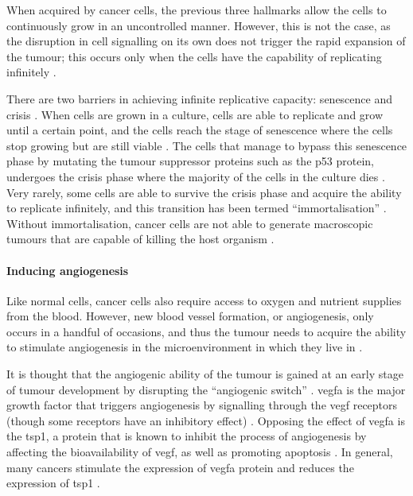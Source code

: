 \noindent
When acquired by cancer cells, the previous three hallmarks allow the cells to continuously grow in an uncontrolled manner.
However, this is not the case, as the disruption in cell signalling on its own does not trigger the rapid expansion of the tumour; this occurs only when the cells have the capability of replicating infinitely \citep{Hanahan2000, Hanahan2011}.

There are two barriers in achieving infinite replicative capacity: senescence and crisis \citep{Hanahan2011}.
When cells are grown in a culture, cells are able to replicate and grow until a certain point, and the cells reach the stage of senescence where the cells stop growing but are still viable \citep{Hanahan2011}.
The cells that manage to bypass this senescence phase by mutating the tumour suppressor proteins such as the p53 protein, undergoes the crisis phase where the majority of the cells in the culture dies \citep{Hanahan2011}.
Very rarely, some cells are able to survive the crisis phase and acquire the ability to replicate infinitely, and this transition has been termed ``immortalisation'' \citep{Hanahan2011, Wright1989}.
Without immortalisation, cancer cells are not able to generate macroscopic tumours that are capable of killing the host organism \citep{Hanahan2000,Hanahan2011}.

\paragraph{Inducing angiogenesis}

\noindent
Like normal cells, cancer cells also require access to oxygen and nutrient supplies from the blood.
However, new blood vessel formation, or angiogenesis, only occurs in a handful of occasions, and thus the tumour needs to acquire the ability to stimulate angiogenesis in the microenvironment in which they live in \citep{Hanahan2011}.

It is thought that the angiogenic ability of the tumour is gained at an early stage of tumour development by disrupting the ``angiogenic switch'' \citep{Hanahan2011}.
\Gls{vegfa} is the major growth factor that triggers angiogenesis by signalling through the \acrshort{vegf} receptors (though some receptors have an inhibitory effect) \citep{Yancopoulos2000}.
Opposing the effect of \Gls{vegfa} is the \gls{tsp1}, a protein that is known to inhibit the process of angiogenesis by affecting the bioavailability of \acrshort{vegf}, as well as promoting apoptosis \citep{Kazerounian2008}.
In general, many cancers stimulate the expression of \gls{vegfa} protein and reduces the expression of \gls{tsp1} \citep{Kazerounian2008}.

